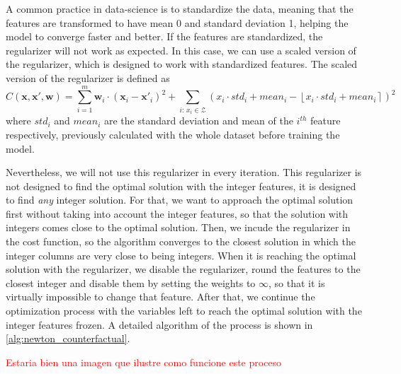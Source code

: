 \documentclass[12pt]{extarticle}
\numberwithin{equation}{section}
\begin{document}

A common practice in data-science is to standardize the data, meaning that the features are transformed to have mean 0 and standard deviation 1, helping the model to converge faster and better. If the features are standardized, the regularizer will not work as expected. In this case, we can use a scaled version of the regularizer, which is designed to work with standardized features. The scaled version of the regularizer is defined as
\begin{equation}\label{eq:cost_reg_scaled}
    C(\mathbf{x}, \mathbf{x}', \mathbf{w}) = \sum_{i=1}^{m} \mathbf{w}_i \cdot (\mathbf{x}_i - \mathbf{x}'_{i})^2 + \sum_{i:\, x_i\in \mathcal{Z}} (x_i \cdot std_i + mean_i - \left\lfloor x_i \cdot std_i + mean_i \right\rceil )^2
\end{equation}
where \(std_i\) and \(mean_i\) are the standard deviation and mean of the \(i^{th}\) feature respectively, previously calculated with the whole dataset before training the model. 

Nevertheless, we will not use this regularizer in every iteration. This regularizer is not designed to find the optimal solution with the integer features, it is designed to find \emph{any} integer solution. For that, we want to approach the optimal solution first without taking into account the integer features, so that the solution with integers comes close to the optimal solution. Then, we incude the regularizer in the cost function, so the algorithm converges to the closest solution in which the integer columns are very close to being integers. When it is reaching the optimal solution with the regularizer, we disable the regularizer, round the features to the closest integer and disable them by setting the weights to $\infty$, so that it is virtually impossible to change that feature. After that, we continue the optimization process with the variables left to reach the optimal solution with the integer features frozen. A detailed algorithm of the process is shown in \autoref{alg:newton_counterfactual}.

\textcolor{red}{Estaria bien una imagen que ilustre como funcione este proceso}
\end{document}
